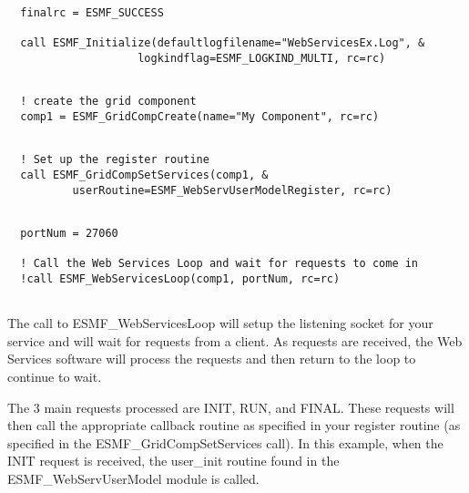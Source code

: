 \begin{verbatim}
  finalrc = ESMF_SUCCESS

  call ESMF_Initialize(defaultlogfilename="WebServicesEx.Log", &
                    logkindflag=ESMF_LOGKIND_MULTI, rc=rc)
 
\end{verbatim}
 

 \begin{verbatim}
  ! create the grid component 
  comp1 = ESMF_GridCompCreate(name="My Component", rc=rc)
 
\end{verbatim}
 

 \begin{verbatim}
  ! Set up the register routine 
  call ESMF_GridCompSetServices(comp1, &
          userRoutine=ESMF_WebServUserModelRegister, rc=rc)
 
\end{verbatim}
 

 \begin{verbatim}
  portNum = 27060

  ! Call the Web Services Loop and wait for requests to come in
  !call ESMF_WebServicesLoop(comp1, portNum, rc=rc)
 
\end{verbatim}
 

    The call to ESMF\_WebServicesLoop will setup the listening socket for your
    service and will wait for requests from a client.  As requests are received,
    the Web Services software will process the requests and then return to the
    loop to continue to wait. 

    The 3 main requests processed are INIT, RUN, and FINAL.  These requests 
    will then call the appropriate callback routine as specified in your 
    register routine (as specified in the ESMF\_GridCompSetServices call).
    In this example, when the INIT request is received, the user\_init routine
    found in the ESMF\_WebServUserModel module is called. 

